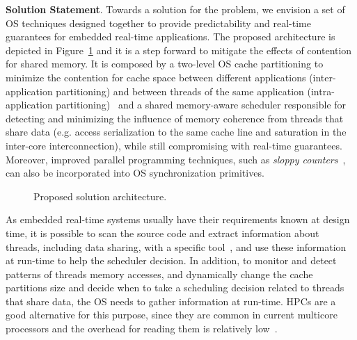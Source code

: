 \documentclass[conference]{IEEEtran}
\newcommand{\fig}[4][ht!]{
  \begin{figure}[#1]
    {\centering{\texttt{[image: fig/\#2]}}\par}
    \caption{#3}
    \label{fig:#2}
  \end{figure}
}
\begin{document}
\textbf{Solution Statement}. Towards a solution for the problem, we envision a set of OS techniques designed together to provide predictability and real-time guarantees for embedded real-time applications. The proposed architecture is depicted in Figure~\ref{fig:proposed_solution} and it is a step forward to mitigate the effects of contention for shared memory. It is composed by a two-level OS cache partitioning to minimize the contention for cache space between different applications (inter-application partitioning) and between threads of the same application (intra-application partitioning)~\cite{Muralidhara:2010} and a shared memory-aware scheduler responsible for detecting and minimizing the influence of memory coherence from threads that share data (e.g. access serialization to the same cache line and saturation in the inter-core interconnection), while still compromising with real-time guarantees. Moreover, improved parallel programming techniques, such as \emph{sloppy counters}~\cite{BoydWickizer:10}, can also be incorporated into OS synchronization primitives.

\fig{proposed_solution}{Proposed solution architecture.}{scale=.6}

As embedded real-time systems usually have their requirements known at design time, it is possible to scan the source code and extract information about threads, including data sharing, with a specific tool~\cite{Cancian:07}, and use these information at run-time to help the scheduler decision. In addition, to monitor and detect patterns of threads memory accesses, and dynamically change the cache partitions size and decide when to take a scheduling decision related to threads that share data, the OS needs to gather information at run-time. HPCs are a good alternative for this purpose, since they are common in current multicore processors and the overhead for reading them is relatively low~\cite{Azimi:2009}. 
\end{document}
